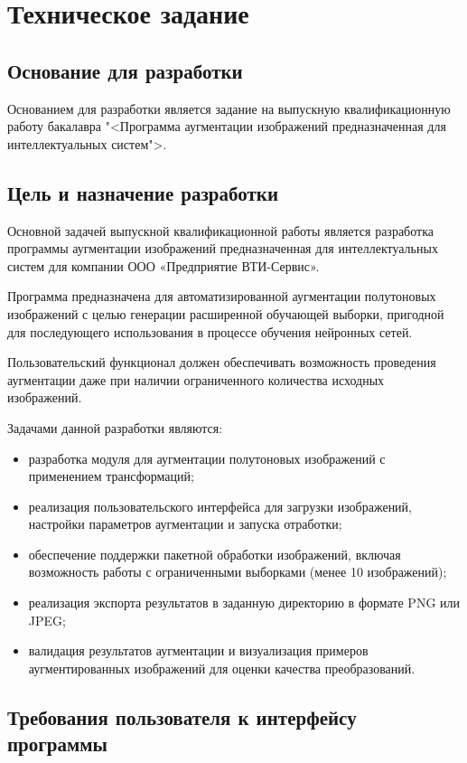 \section{Техническое задание}
\subsection{Основание для разработки}

Основанием для разработки является задание на выпускную квалификационную работу бакалавра "<Программа аугментации изображений предназначенная для интеллектуальных систем">.

\subsection{Цель и назначение разработки}

Основной задачей выпускной квалификационной работы является разработка программы аугментации изображений предназначенная для интеллектуальных систем для компании ООО «Предприятие ВТИ-Сервис».

Программа предназначена для автоматизированной аугментации полутоновых изображений с целью генерации расширенной обучающей выборки, пригодной для последующего использования в процессе обучения нейронных сетей.

Пользовательский функционал должен обеспечивать возможность проведения аугментации даже при наличии ограниченного количества исходных изображений.

Задачами данной разработки являются:

\begin{itemize}
\item разработка модуля для аугментации полутоновых изображений с применением трансформаций;
\item реализация пользовательского интерфейса для загрузки изображений, настройки параметров аугментации и запуска отработки;
\item обеспечение поддержки пакетной обработки изображений, включая возможность работы с ограниченными выборками (менее 10 изображений);
\item реализация экспорта результатов в заданную директорию в формате PNG или JPEG;
\item валидация результатов аугментации и визуализация примеров аугментированных изображений для оценки качества преобразований.
\end{itemize}

\subsection{Требования пользователя к интерфейсу программы}


